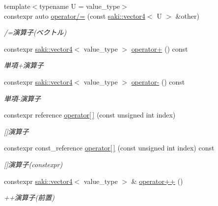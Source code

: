 \begin{DoxyCompactItemize}
{\footnotesize template$<$typename U  = value\+\_\+type$>$ }\\constexpr auto \mbox{\hyperlink{classsaki_1_1vector4_a4801bb02c1dcbbdde6be286699085628}{operator/=}} (const \mbox{\hyperlink{classsaki_1_1vector4}{saki\+::vector4}}$<$ U $>$ \&other)
\begin{DoxyCompactList}\small\item\em /=演算子(ベクトル) \end{DoxyCompactList}\item 
constexpr \mbox{\hyperlink{classsaki_1_1vector4}{saki\+::vector4}}$<$ value\+\_\+type $>$ \mbox{\hyperlink{classsaki_1_1vector4_a05af0dc450cd074cdf247beb8a4ceedd}{operator+}} () const
\begin{DoxyCompactList}\small\item\em 単項+演算子 \end{DoxyCompactList}\item 
constexpr \mbox{\hyperlink{classsaki_1_1vector4}{saki\+::vector4}}$<$ value\+\_\+type $>$ \mbox{\hyperlink{classsaki_1_1vector4_a24f601d217a8ad649cb0109a20baec2b}{operator-\/}} () const
\begin{DoxyCompactList}\small\item\em 単項-\/演算子 \end{DoxyCompactList}\item 
constexpr reference \mbox{\hyperlink{classsaki_1_1vector4_a6f1d99c42ab1163a09614eed8062c9b5}{operator\mbox{[}$\,$\mbox{]}}} (const unsigned int index)
\begin{DoxyCompactList}\small\item\em \mbox{[}\mbox{]}演算子 \end{DoxyCompactList}\item 
constexpr const\+\_\+reference \mbox{\hyperlink{classsaki_1_1vector4_a545d7cafc89c0267507e5c42f0963c18}{operator\mbox{[}$\,$\mbox{]}}} (const unsigned int index) const
\begin{DoxyCompactList}\small\item\em \mbox{[}\mbox{]}演算子(constexpr) \end{DoxyCompactList}\item 
constexpr \mbox{\hyperlink{classsaki_1_1vector4}{saki\+::vector4}}$<$ value\+\_\+type $>$ \& \mbox{\hyperlink{classsaki_1_1vector4_a8e271ede1ff3ffddcaa89a8b3e04fee7}{operator++}} ()
\begin{DoxyCompactList}\small\item\em ++演算子(前置) \end{DoxyCompactList}\item 

\end{DoxyCompactItemize}
